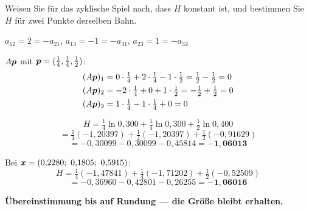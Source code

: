 \begin{aufgabe}
\begin{center}
\begin{minipage}{0.88\textwidth}
\end{minipage}
\end{center}
\end{aufgabe}

\begin{aufgabe}
Weisen Sie für das zyklische Spiel nach, dass $H$ konstant ist, und bestimmen Sie $H$ für zwei Punkte derselben Bahn.

\loesung
{}
 $a_{12} = 2 = -a_{21}$, $a_{13} = -1 = -a_{31}$, $a_{23} = 1 = -a_{32}$ \checkmark

 $A\boldsymbol{p}$ mit $\boldsymbol{p} = (\tfrac14,\tfrac14,\tfrac12)$:
\begin{align*}
(A\boldsymbol{p})_1 &= 0\cdot\tfrac14 + 2\cdot\tfrac14 - 1\cdot\tfrac12 = \tfrac12-\tfrac12 = 0\\
(A\boldsymbol{p})_2 &= -2\cdot\tfrac14 + 0 + 1\cdot\tfrac12 = -\tfrac12+\tfrac12 = 0\\
(A\boldsymbol{p})_3 &= 1\cdot\tfrac14 - 1\cdot\tfrac14 + 0 = 0
\end{align*}
\checkmark

\[ H = \tfrac14\ln 0{,}300 + \tfrac14\ln 0{,}300 + \tfrac12\ln 0{,}400 \]
\[ = \tfrac14(-1{,}20397) + \tfrac14(-1{,}20397) + \tfrac12(-0{,}91629) \]
\[ = -0{,}30099 - 0{,}30099 - 0{,}45814 = \mathbf{-1{,}06013} \]

Bei $\vek x = (0{,}2280;\ 0{,}1805;\ 0{,}5915)$:
\[ H = \tfrac14(-1{,}47841) + \tfrac14(-1{,}71202) + \tfrac12(-0{,}52509) \]
\[ = -0{,}36960 - 0{,}42801 - 0{,}26255 = \mathbf{-1{,}06016} \]

\begin{center}
\begin{minipage}{0.9\textwidth}
\textbf{Übereinstimmung bis auf Rundung --- die Größe bleibt erhalten.}
\end{minipage}
\end{center}


\end{aufgabe}
